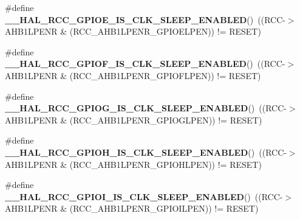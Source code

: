 \begin{DoxyCompactItemize}
\item 
\mbox{\label{group___r_c_c___clock___sleep___enable___disable___status_gaaaf7c0b082ec2d976c4ac33c4f1fd461}} 
\#define {\bfseries \+\_\+\+\_\+\+H\+A\+L\+\_\+\+R\+C\+C\+\_\+\+G\+P\+I\+O\+E\+\_\+\+I\+S\+\_\+\+C\+L\+K\+\_\+\+S\+L\+E\+E\+P\+\_\+\+E\+N\+A\+B\+L\+ED}()~((R\+CC-\/$>$A\+H\+B1\+L\+P\+E\+NR \& (R\+C\+C\+\_\+\+A\+H\+B1\+L\+P\+E\+N\+R\+\_\+\+G\+P\+I\+O\+E\+L\+P\+EN)) != R\+E\+S\+ET)
\item 
\mbox{\label{group___r_c_c___clock___sleep___enable___disable___status_gab2fca3cfeeeb50539e2c5702cff4d719}} 
\#define {\bfseries \+\_\+\+\_\+\+H\+A\+L\+\_\+\+R\+C\+C\+\_\+\+G\+P\+I\+O\+F\+\_\+\+I\+S\+\_\+\+C\+L\+K\+\_\+\+S\+L\+E\+E\+P\+\_\+\+E\+N\+A\+B\+L\+ED}()~((R\+CC-\/$>$A\+H\+B1\+L\+P\+E\+NR \& (R\+C\+C\+\_\+\+A\+H\+B1\+L\+P\+E\+N\+R\+\_\+\+G\+P\+I\+O\+F\+L\+P\+EN)) != R\+E\+S\+ET)
\item 
\mbox{\label{group___r_c_c___clock___sleep___enable___disable___status_ga6696a0a055bb4707b05e237c8a10334b}} 
\#define {\bfseries \+\_\+\+\_\+\+H\+A\+L\+\_\+\+R\+C\+C\+\_\+\+G\+P\+I\+O\+G\+\_\+\+I\+S\+\_\+\+C\+L\+K\+\_\+\+S\+L\+E\+E\+P\+\_\+\+E\+N\+A\+B\+L\+ED}()~((R\+CC-\/$>$A\+H\+B1\+L\+P\+E\+NR \& (R\+C\+C\+\_\+\+A\+H\+B1\+L\+P\+E\+N\+R\+\_\+\+G\+P\+I\+O\+G\+L\+P\+EN)) != R\+E\+S\+ET)
\item 
\mbox{\label{group___r_c_c___clock___sleep___enable___disable___status_gac60e430f28a40aecfc376ad9c00e94f5}} 
\#define {\bfseries \+\_\+\+\_\+\+H\+A\+L\+\_\+\+R\+C\+C\+\_\+\+G\+P\+I\+O\+H\+\_\+\+I\+S\+\_\+\+C\+L\+K\+\_\+\+S\+L\+E\+E\+P\+\_\+\+E\+N\+A\+B\+L\+ED}()~((R\+CC-\/$>$A\+H\+B1\+L\+P\+E\+NR \& (R\+C\+C\+\_\+\+A\+H\+B1\+L\+P\+E\+N\+R\+\_\+\+G\+P\+I\+O\+H\+L\+P\+EN)) != R\+E\+S\+ET)
\item 
\mbox{\label{group___r_c_c___clock___sleep___enable___disable___status_ga9342ae94bf90d2c966e75214755c2a20}} 
\#define {\bfseries \+\_\+\+\_\+\+H\+A\+L\+\_\+\+R\+C\+C\+\_\+\+G\+P\+I\+O\+I\+\_\+\+I\+S\+\_\+\+C\+L\+K\+\_\+\+S\+L\+E\+E\+P\+\_\+\+E\+N\+A\+B\+L\+ED}()~((R\+CC-\/$>$A\+H\+B1\+L\+P\+E\+NR \& (R\+C\+C\+\_\+\+A\+H\+B1\+L\+P\+E\+N\+R\+\_\+\+G\+P\+I\+O\+I\+L\+P\+EN)) != R\+E\+S\+ET)

\end{DoxyCompactItemize}

